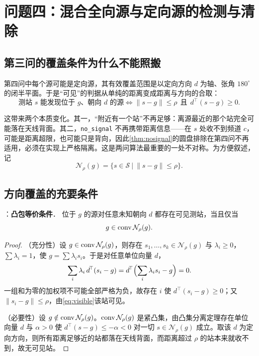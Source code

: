 \section{问题四：混合全向源与定向源的检测与清除}\label{sec:q4}

\subsection{第三问的覆盖条件为什么不能照搬}

第四问中每个源可能是定向源，其有效覆盖范围是以定向方向 $d$ 为轴、张角 $180^\circ$ 的闭半平面。于是“可见”的判据从单纯的距离变成距离与方向的合取：
\begin{equation}\label{eq:visible}
  \text{测站 } s \text{ 能发现位于 } g\text{、朝向 } d \text{ 的源}
  \iff \|s-g\|\le\rho\ \ \text{且}\ \ d^{\!\top}(s-g)\ge0 .
\end{equation}

这带来两个本质变化。其一，“附近有一个站”不再足够：离源最近的那个站完全可能落在天线背面。其二，\texttt{no\_signal} 不再携带距离信息——在 $s$ 处收不到频道 $c$，可能是距离超限，也可能只是背向，因此\cref{thm:nosignal}的圆盘排除在第四问不再适用，必须在实现上严格隔离。这是两问算法最重要的一处不对称。为方便叙述，记
\begin{equation}\label{eq:Tset}
  \mathcal N_\rho(g)=\bigl\{s\in\mathcal S\ \big|\ \|s-g\|\le\rho\bigr\} .
\end{equation}

\subsection{方向覆盖的充要条件}

\begin{theorem}：\textbf{凸包等价条件}．\label{thm:hull}
位于 $g$ 的源对任意未知朝向 $d$ 都存在可见测站，当且仅当
\begin{equation}\label{eq:hullcond}
  g\in\operatorname{conv} \mathcal N_\rho(g).
\end{equation}
\end{theorem}
\begin{proof}
（充分性）设 $g\in\operatorname{conv} \mathcal N_\rho(g)$，则存在 $s_1,\dots,s_k\in \mathcal N_\rho(g)$ 与 $\lambda_i\ge0$，$\sum\lambda_i=1$，使 $g=\sum\lambda_is_i$。于是对任意单位向量 $d$，
\[
  \sum_{i}\lambda_i\,d^{\!\top}(s_i-g)=d^{\!\top}\Bigl(\sum_i\lambda_is_i-g\Bigr)=0 .
\]
一组和为零的加权项不可能全部严格为负，故存在 $i$ 使 $d^{\!\top}(s_i-g)\ge0$；又 $\|s_i-g\|\le\rho$，由\cref{eq:visible}该站可见。

（必要性）设 $g\notin\operatorname{conv} \mathcal N_\rho(g)$。$\operatorname{conv} \mathcal N_\rho(g)$ 是紧凸集，由凸集分离定理存在单位向量 $d$ 与 $\alpha>0$ 使 $d^{\!\top}(s-g)\le-\alpha<0$ 对一切 $s\in \mathcal N_\rho(g)$ 成立。取该 $d$ 为定向方向，则所有距离足够近的站都落在天线背面，而距离超过 $\rho$ 的站本来就收不到，故无可见站。
\end{proof}

